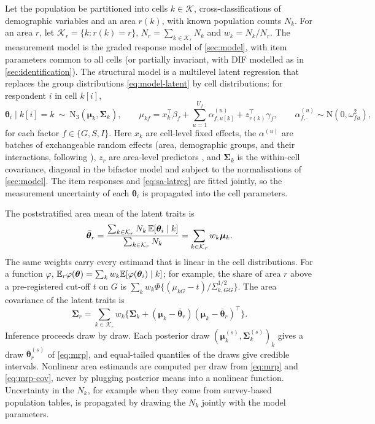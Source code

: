 Let the population be partitioned into cells $k\in\mathcal K$, cross-classifications of demographic variables and an area $r(k)$, with known population counts $N_k$. For an area $r$, let $\mathcal K_r=\{k:r(k)=r\}$, $N_r=\sum_{k\in\mathcal K_r}N_k$ and $w_k=N_k/N_r$. The measurement model is the graded response model of \cref{sec:model}, with item parameters common to all cells (or partially invariant, with DIF modelled as in \cref{sec:identification}). The structural model is a multilevel latent regression that replaces the group distributions \eqref{eq:model-latent} by cell distributions: for respondent $i$ in cell $k[i]$,
\begin{equation}\label{eq:sa-latreg}
  \bm\theta_i\mid k[i]=k\ \sim\ \mathrm N_3(\bm\mu_k,\bm\Sigma_k),\qquad
  \mu_{kf}=x_k^\top\beta_f+\sum_{u=1}^{U_f}\alpha^{(u)}_{f,u[k]}+z_{r(k)}^\top\gamma_f,\qquad
  \alpha^{(u)}_{f,\cdot}\sim\mathrm N(0,\omega_{fu}^2),
\end{equation}
for each factor $f\in\{G,S,I\}$. Here $x_k$ are cell-level fixed effects, the $\alpha^{(u)}$ are batches of exchangeable random effects (area, demographic groups, and their interactions, following \citealp{ghitza2013}), $z_r$ are area-level predictors \citep{park2004}, and $\bm\Sigma_k$ is the within-cell covariance, diagonal in the bifactor model and subject to the normalisations of \cref{sec:model}. The item responses and \eqref{eq:sa-latreg} are fitted jointly, so the measurement uncertainty of each $\bm\theta_i$ is propagated into the cell parameters.

The poststratified area mean of the latent traits is
\begin{equation}\label{eq:mrp}
  \bar{\bm\theta}_r=\frac{\sum_{k\in\mathcal K_r}N_k\,\mathbb{E}[\bm\theta_i\mid k]}{\sum_{k\in\mathcal K_r}N_k}=\sum_{k\in\mathcal K_r}w_k\bm\mu_k .
\end{equation}
The same weights carry every estimand that is linear in the cell distributions. For a function $\varphi$, $\mathbb{E}_r\varphi(\bm\theta)=\sum_kw_k\mathbb{E}[\varphi(\bm\theta_i)\mid k]$; for example, the share of area $r$ above a pre-registered cut-off $t$ on $G$ is $\sum_kw_k\Phi\{(\mu_{kG}-t)/\Sigma_{k,GG}^{1/2}\}$. The area covariance of the latent traits is
\begin{equation}\label{eq:mrp-cov}
  \bm\Sigma_r=\sum_{k\in\mathcal K_r}w_k\bigl\{\bm\Sigma_k+(\bm\mu_k-\bar{\bm\theta}_r)(\bm\mu_k-\bar{\bm\theta}_r)^\top\bigr\}.
\end{equation}
Inference proceeds draw by draw. Each posterior draw $(\bm\mu_k^{(s)},\bm\Sigma_k^{(s)})_{k}$ gives a draw $\bar{\bm\theta}_r^{(s)}$ of \eqref{eq:mrp}, and equal-tailed quantiles of the draws give credible intervals. Nonlinear area estimands are computed per draw from \eqref{eq:mrp} and \eqref{eq:mrp-cov}, never by plugging posterior means into a nonlinear function. Uncertainty in the $N_k$, for example when they come from survey-based population tables, is propagated by drawing the $N_k$ jointly with the model parameters.

